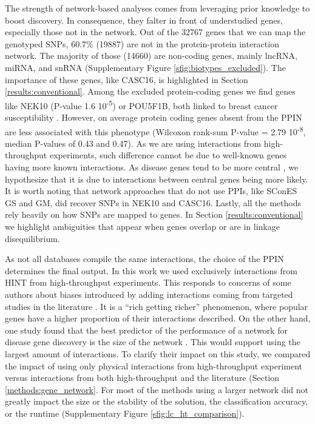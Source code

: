 \documentclass[twocolumn, 10pt]{article}
\begin{document}
The strength of network-based analyses comes from leveraging prior knowledge to boost discovery. In consequence, they falter in front of understudied genes, especially those not in the network. Out of the 32767 genes that we can map the genotyped SNPs, 60.7\% (19887) are not in the protein-protein interaction network. The majority of those (14660) are non-coding genes, mainly lncRNA, miRNA, and snRNA (Supplementary Figure \ref{sfig:biotypes_excluded}). The importance of these genes, like CASC16, is highlighted in Section \ref{results:conventional}. Among the excluded protein-coding genes we find genes like NEK10 (P-value 1.6 \texttimes{} 10\textsuperscript{-5}) or POU5F1B, both linked to breast cancer susceptibility \cite{ahmed_newly_2009}. However, on average protein coding genes absent from the PPIN are less associated with this phenotype (Wilcoxon rank-sum P-value = 2.79 \texttimes{} 10\textsuperscript{-8}, median P-values of 0.43 and 0.47). As we are using interactions from high-throughput experiments, such difference cannot be due to well-known genes having more known interactions. As disease genes tend to be more central \cite{pinero_uncovering_2016}, we hypothesize that it is due to interactions between central genes being more likely. It is worth noting that network approaches that do not use PPIs, like SConES GS and GM, did recover SNPs in NEK10 and CASC16. Lastly, all the methods rely heavily on how SNPs are mapped to genes. In Section \ref{results:conventional} we highlight ambiguities that appear when genes overlap or are in linkage disequilibrium. 

As not all databases compile the same interactions, the choice of the PPIN determines the final output. In this work we used exclusively interactions from HINT from high-throughput experiments. This responds to concerns of some authors about biases introduced by adding interactions coming from targeted studies in the literature \cite{cai_broker_2010,das_hint:_2012}. It is a ``rich getting richer'' phenomenon, where popular genes have a higher proportion of their interactions described. On the other hand, one study found that the best predictor of the performance of a network for disease gene discovery is the size of the network \cite{huang_systematic_2018}. This would support using the largest amount of interactions. To clarify their impact on this study, we compared the impact of using only physical interactions from high-throughput experiment versus interactions from both high-throughput and the literature (Section \ref{methods:gene_network}. For most of the methods using a larger network did not greatly impact the size or the stability of the solution, the classification accuracy, or the runtime (Supplementary Figure \ref{sfig:lc_ht_comparison}). 
\end{document}
